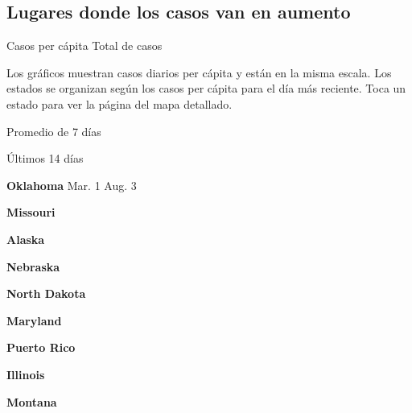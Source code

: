 \hypertarget{lugares-donde-los-casos-van-en-aumento}{%
\subsection{Lugares donde los casos van en
aumento}\label{lugares-donde-los-casos-van-en-aumento}}

Casos per cápita Total de casos

Los gráficos muestran casos diarios per cápita y están en la misma
escala. Los estados se organizan según los casos per cápita para el día
más reciente. Toca un estado para ver la página del mapa detallado.

\href{https://www.nytimes.com/interactive/2020/us/oklahoma-coronavirus-cases.html}{}

Promedio de 7 días

Últimos 14 días

\textbf{Oklahoma} Mar. 1 Aug. 3

\href{https://www.nytimes.com/interactive/2020/us/missouri-coronavirus-cases.html}{}

\textbf{Missouri}

\href{https://www.nytimes.com/interactive/2020/us/alaska-coronavirus-cases.html}{}

\textbf{Alaska}

\href{https://www.nytimes.com/interactive/2020/us/nebraska-coronavirus-cases.html}{}

\textbf{Nebraska}

\href{https://www.nytimes.com/interactive/2020/us/north-dakota-coronavirus-cases.html}{}

\textbf{North Dakota}

\href{https://www.nytimes.com/interactive/2020/us/maryland-coronavirus-cases.html}{}

\textbf{Maryland}

\href{https://www.nytimes.com/interactive/2020/us/puerto-rico-coronavirus-cases.html}{}

\textbf{Puerto Rico}

\href{https://www.nytimes.com/interactive/2020/us/illinois-coronavirus-cases.html}{}

\textbf{Illinois}

\href{https://www.nytimes.com/interactive/2020/us/montana-coronavirus-cases.html}{}

\textbf{Montana}

\href{https://www.nytimes.com/interactive/2020/us/rhode-island-coronavirus-cases.html}{}

